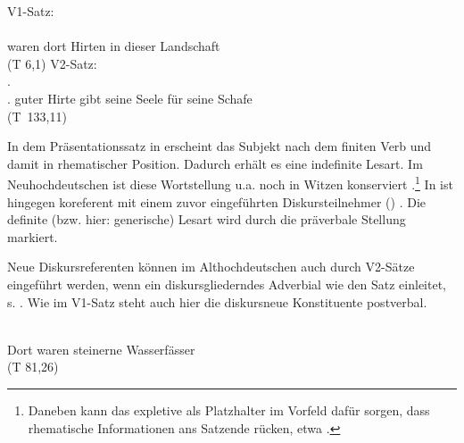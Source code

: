 \begin{exe}
	\ex \label{ex:ahd-is}   
	\begin{xlist}
		\ex \label{ex:ahd-is-indef} V1-Satz:\\
		\gll {}        \\
		waren dort Hirten in dieser Landschaft\\
	\trans {} 
	(T 6,1)
	\ex \label{ex:ahd-is-def} V2-Satz:\\
		.         \\
		[Ich bin guter Hirte]. guter Hirte gibt seine Seele für seine Schafe\\
	\trans {} (T~133,11)

		\end{xlist}
\end{exe}

\noindent
In dem Präsentationssatz in  erscheint das Subjekt  nach dem finiten Verb  und damit in rhematischer Position. Dadurch erhält es eine indefinite Lesart. Im Neuhochdeutschen ist diese Wortstellung u.a. noch in Witzen konserviert \parencite[, vgl.][83]{Ramers2005}.\footnote{Daneben kann das expletive  als Platzhalter im Vorfeld dafür sorgen, dass rhematische Informationen ans Satzende rücken, etwa  \parencite[s. z.B.][]{Hauenschild1993}.} In  ist  hingegen koreferent mit einem zuvor eingeführten Diskursteilnehmer () \parencite[vgl. auch][]{Solf2008}. Die definite (bzw. hier: generische) Lesart wird durch die präverbale Stellung markiert.  

Neue Diskursreferenten können im Althochdeutschen auch durch V2-Sätze eingeführt werden, wenn ein diskursgliederndes Adverbial wie    den Satz einleitet, s.  \parencite[vgl.][152]{Hinterholzl2005}. Wie im V1-Satz steht auch hier die diskursneue Konstituente postverbal. 

\begin{exe} 
\ex \label{ex:v2-tho} 
\gll {}    \\
	Dort waren steinerne Wasserfässer \\
	\trans {} (T 81,26)
\end{exe}

